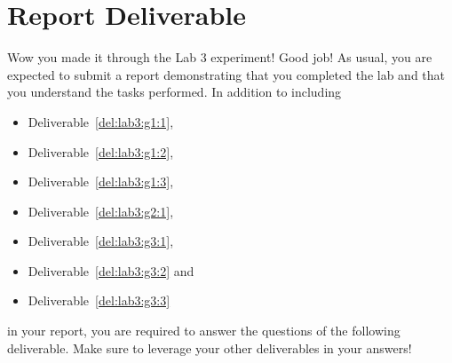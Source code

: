 \section{Report Deliverable}
Wow you made it through the Lab 3 experiment! Good job! As usual, you are expected to submit a report demonstrating that you completed the lab and that you understand the tasks performed.
In addition to including
\begin{itemize}
  \item{Deliverable~\ref{del:lab3:g1:1},}
  \item{Deliverable~\ref{del:lab3:g1:2},}
  \item{Deliverable~\ref{del:lab3:g1:3},}
  \item{Deliverable~\ref{del:lab3:g2:1},}
  \item{Deliverable~\ref{del:lab3:g3:1},}
  \item{Deliverable~\ref{del:lab3:g3:2} and}
  \item{Deliverable~\ref{del:lab3:g3:3}}
\end{itemize}
in your report, you are required to answer the questions of the following deliverable.
Make sure to leverage your other deliverables in your answers!
